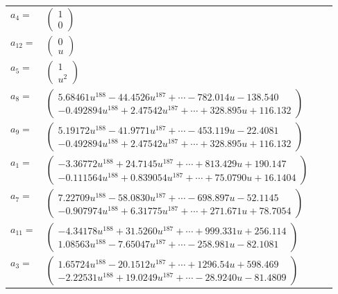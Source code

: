 \documentclass[1p]{elsarticle_modified}
\theoremstyle{definition}
\begin{document}
\begin{tabular}{m{7pt} m{180pt} m{7pt} m{180pt} }
\flushright $a_{4}=$&$\begin{pmatrix}1\\0\end{pmatrix}$ \\
\flushright $a_{12}=$&$\begin{pmatrix}0\\u\end{pmatrix}$ \\
\flushright $a_{5}=$&$\begin{pmatrix}1\\u^2\end{pmatrix}$ \\
\flushright $a_{8}=$&$\begin{pmatrix}5.68461 u^{188}-44.4526 u^{187}+\cdots-782.014 u-138.540\\-0.492894 u^{188}+2.47542 u^{187}+\cdots+328.895 u+116.132\end{pmatrix}$ \\
\flushright $a_{9}=$&$\begin{pmatrix}5.19172 u^{188}-41.9771 u^{187}+\cdots-453.119 u-22.4081\\-0.492894 u^{188}+2.47542 u^{187}+\cdots+328.895 u+116.132\end{pmatrix}$ \\
\flushright $a_{1}=$&$\begin{pmatrix}-3.36772 u^{188}+24.7145 u^{187}+\cdots+813.429 u+190.147\\-0.111564 u^{188}+0.839054 u^{187}+\cdots+75.0790 u+16.1404\end{pmatrix}$ \\
\flushright $a_{7}=$&$\begin{pmatrix}7.22709 u^{188}-58.0830 u^{187}+\cdots-698.897 u-52.1145\\-0.907974 u^{188}+6.31775 u^{187}+\cdots+271.671 u+78.7054\end{pmatrix}$ \\
\flushright $a_{11}=$&$\begin{pmatrix}-4.34178 u^{188}+31.5260 u^{187}+\cdots+999.331 u+256.114\\1.08563 u^{188}-7.65047 u^{187}+\cdots-258.981 u-82.1081\end{pmatrix}$ \\
\flushright $a_{3}=$&$\begin{pmatrix}1.65724 u^{188}-20.1512 u^{187}+\cdots+1296.54 u+598.469\\-2.22531 u^{188}+19.0249 u^{187}+\cdots-28.9240 u-81.4809\end{pmatrix}$ \\

\end{tabular}
\end{document}
